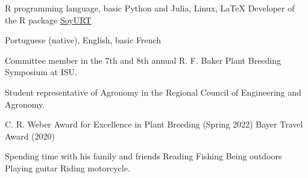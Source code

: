 \documentclass[]{mdkrause_cv_openfont}
\begin{document}
\begin{minipage}[t]{1\textwidth}
\sectionsep

R programming language, basic Python and Julia, Linux, \LaTeX \hspace{1 mm} \textbullet{} Developer of the R package \href{https://cran.r-project.org/web/packages/SoyURT/index.html}{SoyURT} \ExternalLink

\sectionsep

Portuguese (native), English, basic French

\sectionsep

\begin{tightemize}
	\item {} Committee member in the 7th and 8th annual R. F. Baker Plant Breeding Symposium at ISU.
	\item {} Student representative of Agronomy in the Regional Council of Engineering and Agronomy.
\end{tightemize}

\sectionsep

C. R. Weber Award for Excellence in Plant Breeding (Spring 2022) \textbullet{} Bayer Travel Award (2020) \\

\sectionsep

Spending time with his family and friends \textbullet{} Reading \textbullet{} Fishing \textbullet{} Being outdoors \textbullet{} Playing guitar \textbullet{} Riding motorcycle. \\

\sectionsep
{}

\sectionsep
\sectionsep



\end{minipage}
\end{document}
